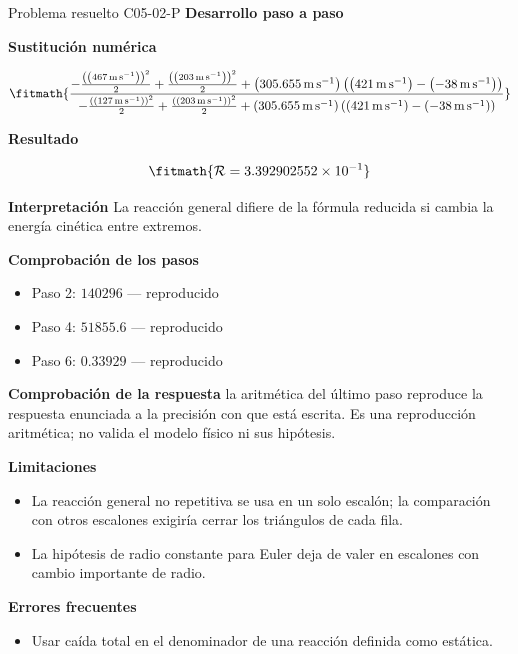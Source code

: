\documentclass[10pt,openany]{book}
\begin{document}
\begin{studiumworked}{Problema resuelto C05-02-P}
\noindent\textbf{Desarrollo paso a paso}



\noindent\textbf{Sustitución numérica}

\[
\fitmath{\frac{- \frac{\left(\left(467\,\mathrm{m}\,\mathrm{s}^{-1}\right)\right)^{2}}{2} + \frac{\left(\left(203\,\mathrm{m}\,\mathrm{s}^{-1}\right)\right)^{2}}{2} + \left(305.655\,\mathrm{m}\,\mathrm{s}^{-1}\right) \left(\left(421\,\mathrm{m}\,\mathrm{s}^{-1}\right) - \left(-38\,\mathrm{m}\,\mathrm{s}^{-1}\right)\right)}{- \frac{\left(\left(127\,\mathrm{m}\,\mathrm{s}^{-1}\right)\right)^{2}}{2} + \frac{\left(\left(203\,\mathrm{m}\,\mathrm{s}^{-1}\right)\right)^{2}}{2} + \left(305.655\,\mathrm{m}\,\mathrm{s}^{-1}\right) \left(\left(421\,\mathrm{m}\,\mathrm{s}^{-1}\right) - \left(-38\,\mathrm{m}\,\mathrm{s}^{-1}\right)\right)}}
\]

\noindent\textbf{Resultado}

\[
\fitmath{\mathcal R=3.392902552\times10^{-1}}
\]

\noindent\textbf{Interpretación}
La reacción general difiere de la fórmula reducida si cambia la energía cinética entre extremos.

\noindent\textbf{Comprobación de los pasos}
\begin{itemize}
\item Paso 2: $140296$ — reproducido
\item Paso 4: $51855.6$ — reproducido
\item Paso 6: $0.33929$ — reproducido
\end{itemize}

\noindent\textbf{Comprobación de la respuesta} la aritmética del último paso reproduce la respuesta enunciada a la precisión con que está escrita. Es una reproducción aritmética; no valida el modelo físico ni sus hipótesis.

\noindent\textbf{Limitaciones}
\begin{itemize}
\item La reacción general no repetitiva se usa en un solo escalón; la comparación con otros escalones exigiría cerrar los triángulos de cada fila.
\item La hipótesis de radio constante para Euler deja de valer en escalones con cambio importante de radio.
\end{itemize}

\noindent\textbf{Errores frecuentes}
\begin{itemize}
\item Usar caída total en el denominador de una reacción definida como estática.
\end{itemize}
\end{studiumworked}
\end{document}
